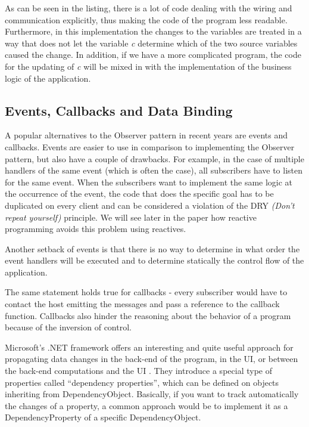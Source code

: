 \documentclass{sigplanconf}
\begin{document}
As can be seen in the listing, there is a lot of code dealing with the wiring and communication explicitly, thus making the code of the program less readable. Furthermore, in this implementation the changes to the variables are treated in a way that does not let the variable \textit{c} determine which of the two source variables caused the change. In addition, if we have a more complicated program, the code for the updating of \textit{c} will be mixed in with the implementation of the business logic of the application. 

\subsection{Events, Callbacks and Data Binding}

A popular alternatives to the Observer pattern in recent years are events and callbacks. 
Events are easier to use in comparison to implementing the Observer pattern, but also have a couple of drawbacks. For example, in the case of multiple handlers of the same event (which is often the case), all subscribers have to listen for the same event. When the subscribers want to implement the same logic at the occurrence of the event, the code that does the specific goal has to be duplicated on every client and can be considered a violation of the DRY \textit{(Don't repeat yourself)} principle. We will see later in the paper how reactive programming avoids this problem using reactives.

Another setback of events is that there is no way to determine in what order the event handlers will be executed and to determine statically the control flow of the application.

The same statement holds true for callbacks - every subscriber would have to contact the host emitting the messages and pass a reference to the callback function. Callbacks also hinder the reasoning about the behavior of a program because of the inversion of control.

Microsoft's .NET framework \cite{net} offers an interesting and quite useful approach for propagating data changes in the back-end of the program, in the UI, or between the back-end computations and the UI \cite{dp}. They introduce a special type of properties called ``dependency properties'', which can be defined on objects inheriting from DependencyObject. Basically, if you want to track automatically the changes of a property, a common approach would be to implement it as a DependencyProperty of a specific DependencyObject. 
\end{document}

